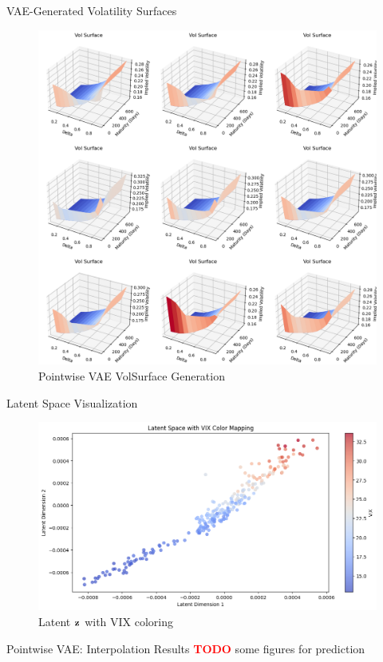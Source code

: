 \documentclass{beamer}
\newcommand\todo{\textcolor{red}{\textbf{TODO}}}
\begin{document}
\begin{frame}{VAE-Generated Volatility Surfaces}
\begin{figure}
    \centering
    \includegraphics[width=0.65\linewidth]{docs/slides/img/vae_pw_ii_beta0.1.png}
    \caption{Pointwise VAE VolSurface Generation}
    \label{fig:enter-label}
\end{figure}
\end{frame}

\begin{frame}{Latent Space Visualization}
\begin{figure}
    \centering
    \includegraphics[width=0.8\linewidth]{docs/slides/img/latent.png}
    \caption{Latent $\bf{z}$ with VIX coloring}
    \label{fig:enter-label}
\end{figure}
\end{frame}

\begin{frame}{Pointwise VAE: Interpolation Results}
\todo
some figures for prediction

\end{frame}
\end{document}
